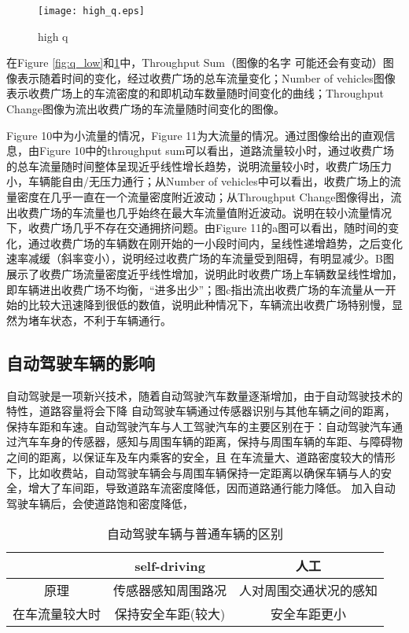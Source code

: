 \documentclass{mcmthesis}
\begin{document}
\begin{figure}[!htbp]
	\small
	\centering
	\texttt{[image: high\_q.eps]}
	\caption{\label{fig:q_high}high q} 
\end{figure}
	在Figure \ref{fig:q_low}和\ref{fig:q_high}中，Throughput Sum（图像的名字 可能还会有变动）图像表示随着时间的变化，经过收费广场的总车流量变化；Number of vehicles图像 表示收费广场上的车流密度的和即机动车数量随时间变化的曲线；Throughput Change图像为流出收费广场的车流量随时间变化的图像。
	
	Figure 10中为小流量的情况，Figure 11为大流量的情况。通过图像给出的直观信息，由Figure 10中的throughput sum可以看出，道路流量较小时，通过收费广场的总车流量随时间整体呈现近乎线性增长趋势，说明流量较小时，收费广场压力小，车辆能自由/无压力通行；从Number of vehicles中可以看出，收费广场上的流量密度在几乎一直在一个流量密度附近波动；从Throughput Change图像得出，流出收费广场的车流量也几乎始终在最大车流量值附近波动。说明在较小流量情况下，收费广场几乎不存在交通拥挤问题。由Figure 11的a图可以看出，随时间的变化，通过收费广场的车辆数在刚开始的一小段时间内，呈线性递增趋势，之后变化速率减缓（斜率变小），说明经过收费广场的车流量受到阻碍，有明显减少。B图展示了收费广场流量密度近乎线性增加，说明此时收费广场上车辆数呈线性增加，即车辆进出收费广场不均衡，“进多出少”；图c指出流出收费广场的车流量从一开始的比较大迅速降到很低的数值，说明此种情况下，车辆流出收费广场特别慢，显然为堵车状态，不利于车辆通行。


\subsection{自动驾驶车辆的影响}
自动驾驶是一项新兴技术，随着自动驾驶汽车数量逐渐增加，由于自动驾驶技术的特性，道路容量将会下降
自动驾驶车辆通过传感器识别与其他车辆之间的距离，保持车距和车速。自动驾驶汽车与人工驾驶汽车的主要区别在于：自动驾驶汽车通过汽车车身的传感器，感知与周围车辆的距离，保持与周围车辆的车距、与障碍物之间的距离，以保证车及车内乘客的安全，且
在车流量大、道路密度较大的情形下，比如收费站，自动驾驶车辆会与周围车辆保持一定距离以确保车辆与人的安全，增大了车间距，导致道路车流密度降低，因而道路通行能力降低。
加入自动驾驶车辆后，会使道路饱和密度降低，
\begin{table}
	\centering
	\caption{\label{tab:test}自动驾驶车辆与普通车辆的区别}
	\begin{tabular}{ccc}
		\toprule
		& self-driving & 人工\\ 
		\midrule
		原理& 传感器感知周围路况& 人对周围交通状况的感知  \\ 
		在车流量较大时& 保持安全车距(较大)&安全车距更小 \\
		\bottomrule
	\end{tabular} 
	
\end{table}
\end{document}
